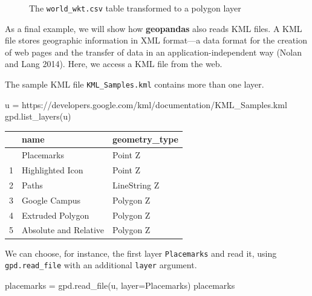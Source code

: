 \documentclass[
  letterpaper,
]{krantz}
\newenvironment{Shaded}{\begin{snugshade}}{\end{snugshade}}
\newcommand{\NormalTok}[1]{\textcolor[rgb]{0.00,0.23,0.31}{#1}}
\newcommand{\OperatorTok}[1]{\textcolor[rgb]{0.37,0.37,0.37}{#1}}
\newcommand{\StringTok}[1]{\textcolor[rgb]{0.13,0.47,0.30}{#1}}
\begin{document}
\begin{figure}[H]


\caption{\label{fig-world_wkt-layer}The \texttt{world\_wkt.csv} table
transformed to a polygon layer}

\end{figure}%

As a final example, we will show how \textbf{geopandas} also reads KML
files. A KML file stores geographic information in XML format---a data
format for the creation of web pages and the transfer of data in an
application-independent way (Nolan and Lang 2014). Here, we access a KML
file from the web.

The sample KML file \texttt{KML\_Samples.kml} contains more than one
layer.

\begin{Shaded}
\begin{Highlighting}[]
\NormalTok{u }\OperatorTok{=} \StringTok{\textquotesingle{}https://developers.google.com/kml/documentation/KML\_Samples.kml\textquotesingle{}}
\NormalTok{gpd.list\_layers(u)}
\end{Highlighting}
\end{Shaded}

\begin{longtable}[]{@{}lll@{}}
\toprule\noalign{}
& name & geometry\_type \\
\midrule\noalign{}
\endhead
\bottomrule\noalign{}
\endlastfoot
0 & Placemarks & Point Z \\
1 & Highlighted Icon & Point Z \\
2 & Paths & LineString Z \\
3 & Google Campus & Polygon Z \\
4 & Extruded Polygon & Polygon Z \\
5 & Absolute and Relative & Polygon Z \\
\end{longtable}

We can choose, for instance, the first layer
\texttt{\textquotesingle{}Placemarks\textquotesingle{}} and read it,
using \texttt{gpd.read\_file} with an additional \texttt{layer}
argument.

\begin{Shaded}
\begin{Highlighting}[]
\NormalTok{placemarks }\OperatorTok{=}\NormalTok{ gpd.read\_file(u, layer}\OperatorTok{=}\StringTok{\textquotesingle{}Placemarks\textquotesingle{}}\NormalTok{)}
\NormalTok{placemarks}
\end{Highlighting}
\end{Shaded}
\end{document}
